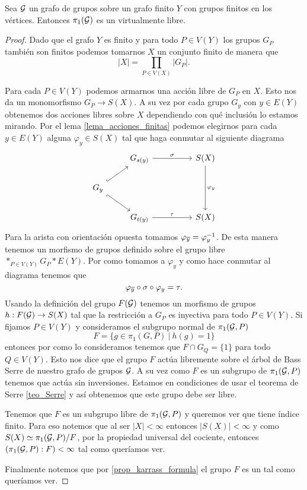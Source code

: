 \documentclass[tesis.tex]{subfiles}
\begin{document}
\begin{teo}\cite{karrass1973finite}
	Sea $\cal G$ un grafo de grupos sobre un grafo finito $Y$ con grupos finitos en los vértices.
	Entonces $\pi_1(\cal G)$ es un \fg virtualmente libre.
\end{teo}
\begin{proof}
	Dado que el grafo $Y$ es finito y para todo $P \in V(Y)$ los grupos $G_P$ también son finitos podemos tomarnos $X$ un conjunto finito de manera que
	\[
		|X| = \prod_{P \in V(X)} |G_P|.
	\] 
	
	Para cada $P \in V(Y)$ podemos armarnos una acción libre de $G_P$ en $X$. 
	Esto nos da un monomorfismo $G_P \to S(X)$.
	A su vez por cada grupo $G_y$ con $y \in E(Y)$ obtenemos dos acciones libres sobre $X$ dependiendo con qué inclusión lo estamos mirando.
	Por el lema \ref{lema_acciones_finitas} podemos elegirnos para cada $y \in E(Y)$ alguna $\varphi_y \in S(X)$ tal que haga conmutar al siguiente diagrama
	\[\begin{tikzcd}
		& {G_{s(y)}} && {S(X)} \\
		{G_y} \\
		& {G_{t(y)}} && {S(X)}
		\arrow["\sigma", from=1-2, to=1-4]
		\arrow["\tau", from=3-2, to=3-4]
		\arrow[hook, from=2-1, to=1-2]
		\arrow[hook', from=2-1, to=3-2]
		\arrow["\varphi_y", from=1-4, to=3-4]
	\end{tikzcd}\]
	Para la arista con orientación opuesta tomamos $\varphi_{\overline y} = \varphi_y^{-1}$.
	De esta manera tenemos un morfismo de grupos definido sobre el grupo libre $\ast_{P \in V(Y)} G_P \ast E(Y)$.
	Por como tomamos a $\varphi_y$ y como hace conmutar al diagrama tenemos que 
	\[
	\varphi_{\overline y} \circ \sigma \circ \varphi_y = \tau.
	\]	
	Usando la definición del grupo $F({\cal G})$ tenemos un morfismo de grupos $h: F({\cal G}) \to S(X)$ tal que la restricción a $G_P$ es inyectiva para todo $P \in V(Y)$.
	Si fijamos $P \in V(Y)$ y consideramos el subgrupo normal de $\pi_1({\cal G}, P)$ 
	\[
	F = \{  g \in \pi_1(G,P) \ | \ h(g) = 1  \}
	\]
	entonces por como lo consideramos tenemos que $F \cap G_Q = \{ 1 \}$ para todo $Q \in V(Y)$.
	Esto nos dice que el grupo $F$ actúa libremente sobre el árbol de Bass Serre de nuestro grafo de grupos ${\cal G}$.
	A su vez como $F$ es un subgrupo de $\pi_1 ({\cal G}, P)$ tenemos que actúa sin inversiones.
	Estamos en condiciones de usar el teorema de Serre \ref{teo_Serre} y así obtenemos que este grupo debe ser libre. 
	
	Tenemos que $F$ es un subgrupo libre de $\pi_1({\cal G}, P)$ y queremos ver que tiene índice finito.
	Para eso notemos que al ser $|X| < \infty$ entonces $|S(X)| < \infty$ y como $S(X) \simeq \pi_1({\cal G}, P) / F$, por la propiedad universal del cociente, entonces $(\pi_1({\cal G}, P) : F) < \infty$ tal como queríamos ver.
	
	Finalmente notemos que por \ref{prop_karrass_formula} el grupo $F$ es un \fg tal como queríamos ver.
\end{proof}
\end{document}
